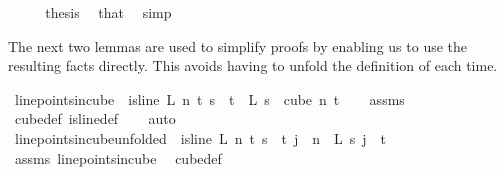 \begin{isabellebody}
\ \ \isamarkupfalse%
\ \isamarkupfalse%
\ {\isacharquery}{\kern0pt}thesis\ \isamarkupfalse%
\ that\ \isamarkupfalse%
\ simp\isanewline
{}\isamarkupfalse%
%
\endisatagproof
{\isafoldproof}%
%
\isadelimproof
%
\endisadelimproof
%
\begin{isamarkuptext}%
The next two lemmas are used to simplify proofs by enabling us to use the resulting facts directly. This avoids having to unfold the definition of  each time.%
\end{isamarkuptext}\isamarkuptrue%
\isamarkupfalse%
\ line{\isacharunderscore}{\kern0pt}points{\isacharunderscore}{\kern0pt}in{\isacharunderscore}{\kern0pt}cube{\isacharcolon}{\kern0pt}\ \ {\isachardoublequoteopen}is{\isacharunderscore}{\kern0pt}line\ L\ n\ t{\isachardoublequoteclose}\ {\isachardoublequoteopen}s\ {\isacharless}{\kern0pt}\ t{\isachardoublequoteclose}\ \ {\isachardoublequoteopen}L\ s\ {\isasymin}\ cube\ n\ t{\isachardoublequoteclose}\isanewline
%
\isadelimproof
\ \ %
\endisadelimproof
%
\isatagproof
{}\isamarkupfalse%
\ assms\ \isamarkupfalse%
\ cube{\isacharunderscore}{\kern0pt}def\ is{\isacharunderscore}{\kern0pt}line{\isacharunderscore}{\kern0pt}def\isanewline
\ \ \isamarkupfalse%
\ auto%
\endisatagproof
{\isafoldproof}%
%
\isadelimproof
\ \ \ \ \ \isanewline
%
\endisadelimproof
\isanewline
{}\isamarkupfalse%
\ line{\isacharunderscore}{\kern0pt}points{\isacharunderscore}{\kern0pt}in{\isacharunderscore}{\kern0pt}cube{\isacharunderscore}{\kern0pt}unfolded{\isacharcolon}{\kern0pt}\ \ {\isachardoublequoteopen}is{\isacharunderscore}{\kern0pt}line\ L\ n\ t{\isachardoublequoteclose}\ {\isachardoublequoteopen}s\ {\isacharless}{\kern0pt}\ t{\isachardoublequoteclose}\ {\isachardoublequoteopen}j\ {\isacharless}{\kern0pt}\ n{\isachardoublequoteclose}\ \ {\isachardoublequoteopen}L\ s\ j\ {\isasymin}\ {\isacharbraceleft}{\kern0pt}{\isachardot}{\kern0pt}{\isachardot}{\kern0pt}{\isacharless}{\kern0pt}t{\isacharbraceright}{\kern0pt}{\isachardoublequoteclose}\ \isanewline
%
\isadelimproof
\ \ %
\endisadelimproof
%
\isatagproof
{}\isamarkupfalse%
\ assms\ line{\isacharunderscore}{\kern0pt}points{\isacharunderscore}{\kern0pt}in{\isacharunderscore}{\kern0pt}cube\ \isamarkupfalse%
\ cube{\isacharunderscore}{\kern0pt}def\ \isamarkupfalse%

\end{isabellebody}
